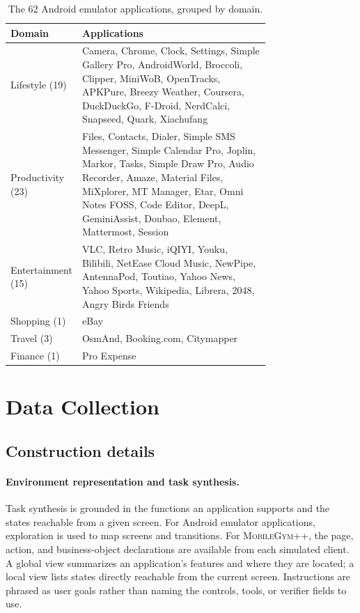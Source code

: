 \begin{table}[t]
\centering
\small
\caption{The 62 Android emulator applications, grouped by domain.}
\label{tab:app-emu-list}
\begin{tabular}{lp{0.74\linewidth}}
\toprule
Domain & Applications \\
\midrule
Lifestyle (19) & Camera, Chrome, Clock, Settings, Simple Gallery Pro, AndroidWorld, Broccoli, Clipper, MiniWoB, OpenTracks, APKPure, Breezy Weather, Coursera, DuckDuckGo, F-Droid, NerdCalci, Snapseed, Quark, Xiachufang \\
Productivity (23) & Files, Contacts, Dialer, Simple SMS Messenger, Simple Calendar Pro, Joplin, Markor, Tasks, Simple Draw Pro, Audio Recorder, Amaze, Material Files, MiXplorer, MT Manager, Etar, Omni Notes FOSS, Code Editor, DeepL, GeminiAssist, Doubao, Element, Mattermost, Session \\
Entertainment (15) & VLC, Retro Music, iQIYI, Youku, Bilibili, NetEase Cloud Music, NewPipe, AntennaPod, Toutiao, Yahoo News, Yahoo Sports, Wikipedia, Librera, 2048, Angry Birds Friends \\
Shopping (1) & eBay \\
Travel (3) & OsmAnd, Booking.com, Citymapper \\
Finance (1) & Pro Expense \\
\bottomrule
\end{tabular}
\end{table}

\section{Data Collection}
\label{app:data}

\subsection{Construction details}
\label{app:sft-data}

\paragraph{Environment representation and task synthesis.}
Task synthesis is grounded in the functions an application supports and the states reachable from a given screen. For Android emulator applications, exploration is used to map screens and transitions. For \textsc{MobileGym++}, the page, action, and business-object declarations are available from each simulated client. A global view summarizes an application's features and where they are located; a local view lists states directly reachable from the current screen. Instructions are phrased as user goals rather than naming the controls, tools, or verifier fields to use.

